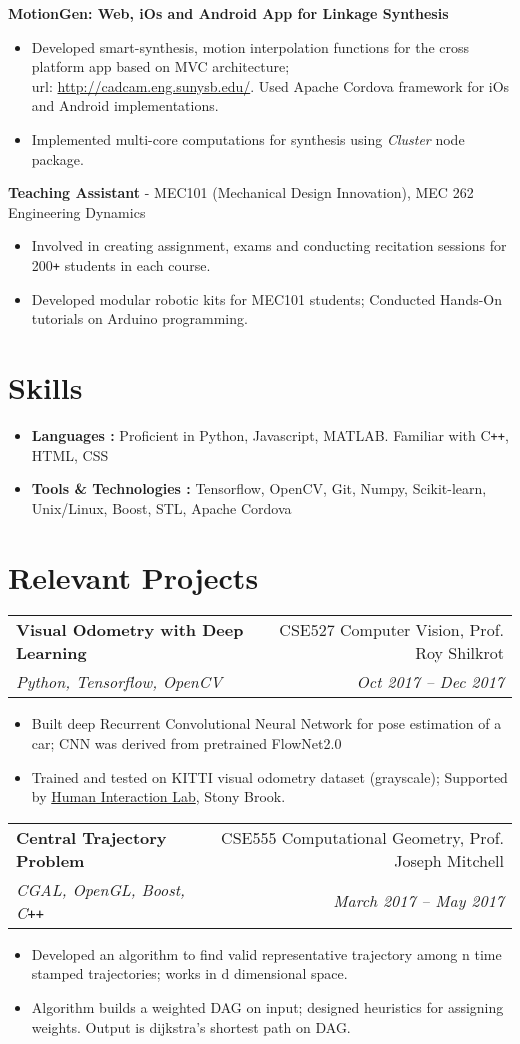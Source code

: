 \documentclass[letterpaper,10pt]{article}
\makeatletter
\newcommand{\resumeHeading}[4]{
  \vspace{-1pt}
    \begin{tabular*}{0.97\textwidth}{l@{\extracolsep{\fill}}r}
      \textbf{#1} & #2 \vspace{-2pt}\\ \vspace{1pt}
      \textit{\small#3} & \textit{\small #4} \\
    \end{tabular*}
}
\newcommand{\resumeSubheading}[1]{
      {\small\textbf{#1}} \\
}
\newcommand{\resumeSubheadingNew}[1]{
      {\small{#1}} \\
}
\newcommand{\resumeSection}[1]{
\vspace{-12pt}
\section{\textbf{#1}}
}
\newcommand{\resumeItemListStart}{
\vspace{-7pt}
\begin{itemize}[leftmargin=14pt]
}
\newcommand{\resumeItemListEnd}{
\vspace{+7pt}
\end{itemize}
}
\newcommand{\resumeItem}[1]{
  \item\small{
      {#1 \vspace{-7pt}
      }
  }
}
\makeatother
\begin{document}
      \vspace{-5pt}
      \resumeSubheading{MotionGen: Web, iOs and Android App for Linkage Synthesis}
      \resumeItemListStart
        \resumeItem{Developed smart-synthesis, motion interpolation functions for the cross platform app based on MVC architecture; \\ url: \href{http://cadcam.eng.sunysb.edu/}{http://cadcam.eng.sunysb.edu/}. Used Apache Cordova framework for iOs and Android implementations.}
        \resumeItem{Implemented multi-core computations for synthesis using \emph{Cluster} node package.}
      \resumeItemListEnd

      \vspace{-5pt}
      \resumeSubheadingNew{\textbf{Teaching Assistant} - MEC101 (Mechanical Design Innovation), MEC 262 Engineering Dynamics}
      \resumeItemListStart
        \resumeItem{Involved in creating assignment, exams and conducting recitation sessions for 200\texttt{+} students in each course.}
        \resumeItem{Developed modular robotic kits for MEC101 students; Conducted Hands-On tutorials on Arduino programming.}
      \resumeItemListEnd

\resumeSection{Skills}
\vspace{+7pt}
    \resumeItemListStart
      \resumeItem{\textbf{Languages :} Proficient in Python, Javascript, MATLAB. Familiar with C\texttt{++}, HTML, CSS}
      \resumeItem{\textbf{Tools \& Technologies :} Tensorflow, OpenCV, Git, Numpy, Scikit-learn, Unix/Linux, Boost, STL, Apache Cordova}
    \resumeItemListEnd


\resumeSection{Relevant Projects}
    \resumeHeading{Visual Odometry with Deep Learning}{CSE527 Computer Vision, Prof. Roy Shilkrot} {Python, Tensorflow, OpenCV}{Oct 2017 -- Dec 2017}
    \resumeItemListStart
      \resumeItem{Built deep Recurrent Convolutional Neural Network for pose estimation of a car; CNN was derived from pretrained FlowNet2.0}
      \resumeItem{Trained and tested on KITTI visual odometry dataset (grayscale); Supported by \href{http://hi.cs.stonybrook.edu/}{Human Interaction Lab}, Stony Brook.}
    \resumeItemListEnd

    \resumeHeading{Central Trajectory Problem}{CSE555 Computational Geometry, Prof. Joseph Mitchell}{CGAL, OpenGL, Boost, C\texttt{++}}{March 2017 -- May 2017}
    \resumeItemListStart
      \resumeItem{Developed an algorithm to find valid representative trajectory among n time stamped trajectories; works in d dimensional space.}
      \resumeItem{Algorithm builds a weighted DAG on input; designed heuristics for assigning weights. Output is dijkstra's shortest path on DAG.}
    \resumeItemListEnd
\end{document}

